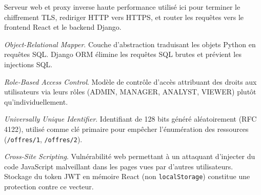 \begin{description}[leftmargin=3cm, labelwidth=2.5cm, font=\bfseries]
    \item[Nginx] Serveur web et proxy inverse haute performance utilisé ici pour
    terminer le chiffrement TLS, rediriger HTTP vers HTTPS, et router les requêtes
    vers le frontend React et le backend Django.

    \item[ORM] \textit{Object-Relational Mapper}.
    Couche d'abstraction traduisant les objets Python en requêtes SQL.
    Django ORM élimine les requêtes SQL brutes et prévient les injections SQL.

    \item[RBAC] \textit{Role-Based Access Control}.
    Modèle de contrôle d'accès attribuant des droits aux utilisateurs via
    leurs rôles (ADMIN, MANAGER, ANALYST, VIEWER) plutôt qu'individuellement.

    \item[UUID] \textit{Universally Unique Identifier}.
    Identifiant de 128 bits généré aléatoirement (RFC 4122), utilisé comme clé primaire
    pour empêcher l'énumération des ressources (\texttt{/offres/1}, \texttt{/offres/2}).

    \item[XSS] \textit{Cross-Site Scripting}.
    Vulnérabilité web permettant à un attaquant d'injecter du code JavaScript malveillant
    dans les pages vues par d'autres utilisateurs. Stockage du token JWT en mémoire React
    (non \texttt{localStorage}) constitue une protection contre ce vecteur.

\end{description}

\newpage
